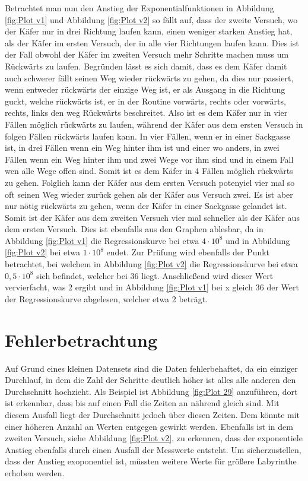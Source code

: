 \documentclass[12pt, a4paper, titlepage]{article}
\begin{document}
\bigskip

Betrachtet man nun den Anstieg der Exponentialfunktionen in Abbildung \ref{fig:Plot v1} und Abbildung \ref{fig:Plot v2} so fällt auf, dass der zweite Versuch, wo der Käfer nur in drei Richtung laufen kann, einen weniger starken Anstieg hat, als der Käfer im ersten Versuch, der in alle vier Richtungen laufen kann.
Dies ist der Fall obwohl der Käfer im zweiten Versuch mehr Schritte machen muss um Rückwärts zu laufen.
Begründen lässt es sich damit, dass es dem Käfer damit auch schwerer fällt seinen Weg wieder rückwärts zu gehen, da dies nur passiert, wenn entweder rückwärts der einzige Weg ist, er als Ausgang in die Richtung guckt, welche rückwärts ist, er in der Routine vorwärts, rechts oder vorwärts, rechts, links den weg Rückwärts beschreitet.
Also ist es dem Käfer nur in vier Fällen möglich rückwärts zu laufen, während der Käfer aus dem ersten Versuch in folgen Fällen rückwärts laufen kann.
In vier Fällen, wenn er in einer Sackgasse ist, in drei Fällen wenn ein Weg hinter ihm ist und einer wo anders, in zwei Fällen wenn ein Weg hinter ihm und zwei Wege vor ihm sind und in einem Fall wen alle Wege offen sind.
Somit ist es dem Käfer in 4 Fällen möglich rückwärts zu gehen.
Folglich kann der Käfer aus dem ersten Versuch potenyiel vier mal so oft seinen Weg wieder zurück gehen als der Käfer aus Versuch zwei.
Es ist aber nur nötig rückwärts zu gehen, wenn der Käfer in einer Sackgasse gelandet ist.
Somit ist der Käfer aus dem zweiten Versuch vier mal schneller als der Käfer aus dem ersten Versuch.
Dies ist ebenfalls aus den Graphen ablesbar, da in Abbildung \ref{fig:Plot v1} die Regressionskurve bei etwa $4 \cdot 10^8$ und in Abbildung \ref{fig:Plot v2} bei etwa $1 \cdot 10^8$ endet.
Zur Prüfung wird ebenfalls der Punkt betrachtet, bei welchem in Abbildung \ref{fig:Plot v2} die Regressionskurve bei etwa $0,5 \cdot 10^8$ sich befindet, welcher bei 36 liegt.
Anschließend wird dieser Wert vervierfacht, was 2 ergibt und in Abbildung \ref{fig:Plot v1} bei x gleich 36 der Wert der Regressionskurve abgelesen, welcher etwa 2 beträgt.

\section{Fehlerbetrachtung}

Auf Grund eines kleinen Datensets sind die Daten fehlerbehaftet, da ein einziger Durchlauf, in dem die Zahl der Schritte deutlich höher ist alles alle anderen den Durchschnitt hochzieht.
Als Beispiel ist Abbildung \ref{fig:Plot 29} anzuführen, dort ist erkennbar, dass bis auf einen Fall die Zeiten an nährend gleich sind.
Mit diesem Ausfall liegt der Durchschnitt jedoch über diesen Zeiten.
Dem könnte mit einer höheren Anzahl an Werten entgegen gewirkt werden.
Ebenfalls ist in dem zweiten Versuch, siehe Abbildung \ref{fig:Plot v2}, zu erkennen, dass der exponentiele Anstieg ebenfalls durch einen Ausfall der Messwerte entsteht.
Um sicherzustellen, dass der Anstieg exoponentiel ist, müssten weitere Werte für größere Labyrinthe erhoben werden.
\end{document}

